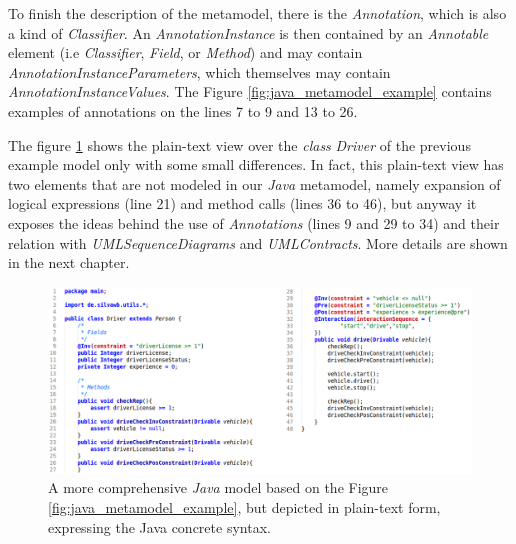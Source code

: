 \documentclass[tuberlin,cic,tc,english,noabntcite]{iiufrgs}
\begin{document}
To finish the description of the metamodel, there is the \emph{Annotation}, which is also a kind of \emph{Classifier}. An \emph{AnnotationInstance} is then contained by an \emph{Annotable} element (i.e \emph{Classifier}, \emph{Field}, or \emph{Method}) and may contain \emph{AnnotationInstanceParameters}, which themselves may contain \emph{AnnotationInstanceValues}. The Figure \ref{fig:java_metamodel_example} contains examples of annotations on the lines 7 to 9 and 13 to 26.

The figure \ref{fig:java_metamodel_example_text01} shows the plain-text view over the \emph{class} \emph{Driver} of the previous example model only with some small differences. In fact, this plain-text view has two elements that are not modeled in our \emph{Java} metamodel, namely expansion of logical expressions (line 21) and method calls (lines 36 to 46), but anyway it exposes the ideas behind the use of \emph{Annotations} (lines 9 and 29 to 34) and their relation with \emph{UMLSequenceDiagrams} and \emph{UMLContracts}. More details are shown in the next chapter.

\begin{figure}[H]
    \caption{A more comprehensive \emph{Java} model based on the Figure \ref{fig:java_metamodel_example}, but depicted in plain-text form, expressing the Java concrete syntax.}
    \begin{center}
        \includegraphics[width=\textwidth]{javaMetamodelExample01_Text}
    \end{center}
    \label{fig:java_metamodel_example_text01}
\end{figure}

\end{document}
